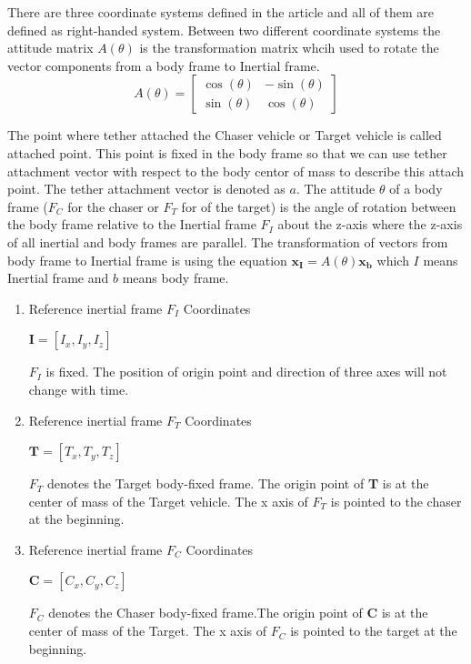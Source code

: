 There are three coordinate systems defined in the article and all of them are defined as right-handed system. Between two different coordinate systems the attitude matrix $A(\theta)$ is the transformation matrix whcih used to rotate the vector components from a body frame to Inertial frame. 
\begin{equation}
A(\theta) =
	\begin{bmatrix}
	\cos(\theta) & -\sin(\theta) \\
	\sin(\theta) & \cos(\theta)
	\end{bmatrix}
\end{equation}

	The point where tether attached the Chaser vehicle or Target vehicle is called attached point. This point is fixed in the body frame so that we can use tether attachment vector with respect to the body centor of mass to describe this attach point. The tether attachment vector is denoted as $a$.
The attitude $\theta$  of a body frame ($F_C$ for the chaser or $F_T$ for of the target) is the angle of rotation between the body frame relative to the Inertial frame $F_I$ about the z-axis where the z-axis of all inertial and body frames are parallel. The transformation of vectors from body frame to Inertial frame is using the equation  $\mathbf{x_I}=A(\theta)\mathbf{x_b}$ which $I$ means Inertial frame and $b$ means body frame.
\boldmath
\begin{enumerate}

\item Reference inertial frame $F_I$ Coordinates\\		
\begin{center} $\textbf{I} =[I_x, I_y, I_z]$ \end{center}
\textbf {$F_I$} is fixed. The position of origin point and direction of three axes will not change with time.    


\item Reference inertial frame $F_T$ Coordinates\\		
\begin{center} $\textbf{T} =[T_x, T_y, T_z]$ \end{center}
\textbf{$F_T$} denotes the Target body-fixed frame. The origin point of \textbf{T} is at the center of mass of the Target vehicle. The x axis of $F_T$ is pointed to the chaser at the beginning. 

\item Reference inertial frame $F_C$ Coordinates\\		
\begin{center} $\textbf{C} =[C_x, C_y, C_z]$ \end{center}
\textbf{$F_C$} denotes the Chaser body-fixed frame.The origin point of \textbf{C} is at the center of mass of the Target. The x axis of $F_C$ is pointed to the target at the beginning. 
\end{enumerate}
\unboldmath

